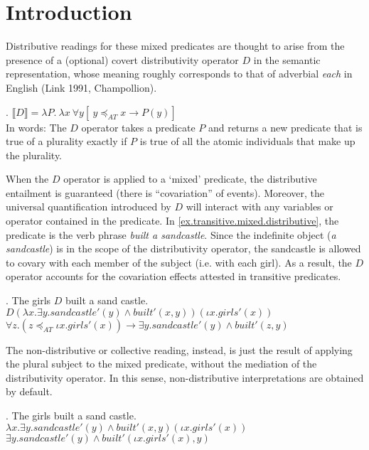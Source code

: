 \documentclass[a4paper]{article}
\title{}
\author{}
\newcommand{\addMM}[1]{{\leavevmode\color{red}#1}}
\begin{document}
\maketitle

\section{Introduction}


Distributive readings for these mixed predicates are thought to arise from the presence of a (optional) covert distributivity operator $D$ in the semantic representation, whose meaning roughly corresponds to that of adverbial \textit{each} in English (Link 1991, Champollion). 

\ex. $ \llbracket D \rrbracket = \lambda P.  \ \lambda x \ \forall y[\ y \preceq_{AT} x \rightarrow P(y)]$ \\
In words: The $D$ operator takes a predicate $P$ and returns a new predicate that is true of a plurality exactly if $P$ is true of all the atomic individuals that make up the plurality. 

When the $D$ operator is applied to a `mixed' predicate, the distributive entailment is guaranteed \addMM{(there is ``covariation'' of events)}. Moreover, the universal quantification introduced by $D$ will interact with any variables or operator contained in the predicate. In \ref{ex.transitive.mixed.distributive}, the predicate is the verb phrase \textit{built a sandcastle}. Since the indefinite object (\textit{a sandcastle}) is in the scope of the distributivity operator, the sandcastle is allowed to covary with each member of the subject (i.e. with each girl). 
As a result, the $D$ operator accounts for the covariation effects attested in transitive predicates. 

\ex. The girls $D$ built a sand castle.\label{ex.transitive.mixed.distributive} \\ 
    $D(\lambda x.\exists y.\mathit{sandcastle}'(y) \wedge \textit{built}'(x,y))(\iota x.\mathit{girls}'(x))$\\
    $\forall z . (z\preceq_{AT}\iota x.\mathit{girls}'(x)) \rightarrow \exists y.\mathit{sand castle}'(y) \wedge \textit{built}'(z,y)$

The non-distributive or collective reading, instead, is just the result of applying the plural subject to the mixed predicate, without the mediation of the distributivity operator. In this sense, non-distributive interpretations are obtained by default. 

\ex. The girls built a sand castle.\\
    $\lambda x.\exists y.\mathit{sand castle}'(y) \wedge \textit{built}'(x,y)(\iota x.\mathit{girls}'(x))$\\
        $\exists y.\mathit{sandcastle}'(y) \wedge \textit{built}'(\iota x.\mathit{girls}'(x),y)$
\end{document}
